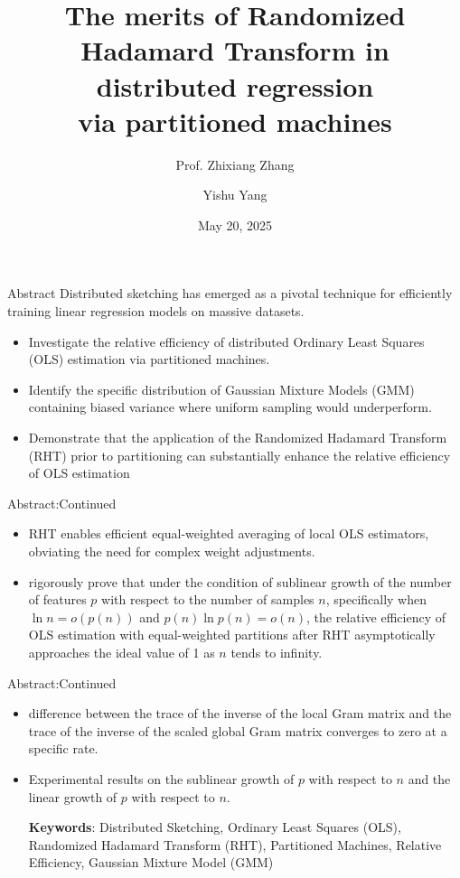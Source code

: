 \documentclass{beamer}
\title{The merits of Randomized Hadamard Transform in distributed regression \\
via partitioned machines}
\author{Prof. Zhixiang Zhang \and Yishu Yang}
\institute{Faculty of Science and Technology, University of Macau}
\date{May 20, 2025}
\theoremstyle{remark}
\begin{document}
\begin{frame}
  \titlepage
\end{frame}


\begin{frame}{Abstract}
    Distributed sketching has emerged as a pivotal technique for efficiently training linear regression models on massive datasets.
    \begin{itemize}
        \item Investigate the relative efficiency of distributed Ordinary Least Squares (OLS) estimation via partitioned machines.
        \item Identify the specific distribution of Gaussian Mixture Models (GMM) containing biased variance where uniform sampling would underperform.
        \item Demonstrate that the application of the Randomized Hadamard Transform (RHT) prior to partitioning can substantially enhance the relative efficiency of OLS estimation
    \end{itemize}
\end{frame}

\begin{frame}{Abstract:Continued}
    \begin{itemize}
        \item RHT enables efficient equal-weighted averaging of local OLS estimators, obviating the need for complex weight adjustments.
        \item rigorously prove that under the condition of sublinear growth of the number of features $p$ with respect to the number of samples $n$, specifically when $\ln n = o(p(n))$ and $p(n)\ln p(n) = o(n)$, the relative efficiency of OLS estimation with equal-weighted partitions after RHT asymptotically approaches the ideal value of 1 as $n$ tends to infinity.
    \end{itemize}
    \end{frame}

\begin{frame}{Abstract:Continued}
    \begin{itemize}
        \item difference between the trace of the inverse of the local Gram matrix and the trace of the inverse of the scaled global Gram matrix converges to zero at a specific rate.
        \item Experimental results on the sublinear growth of $p$ with respect to $n$ and the linear growth of $p$ with respect to $n$.
        
        \vspace{0.2cm}
        \textbf{Keywords}: Distributed Sketching, Ordinary Least Squares (OLS), Randomized Hadamard Transform (RHT), Partitioned Machines, Relative Efficiency, Gaussian Mixture Model (GMM)
    \end{itemize}
    \end{frame}
\end{document}
